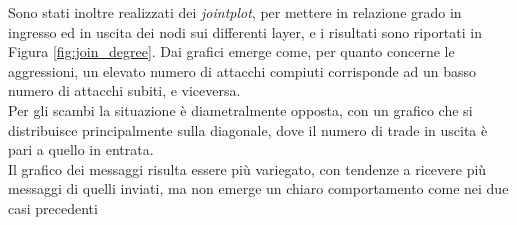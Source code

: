 Sono stati inoltre realizzati dei \textit{jointplot}, per mettere in relazione grado in ingresso ed in uscita dei nodi sui differenti layer, e i risultati sono riportati in Figura \ref{fig:join_degree}. Dai grafici emerge come, per quanto concerne le aggressioni, un elevato numero di attacchi compiuti corrisponde ad un basso numero di attacchi subiti, e viceversa.\\
Per gli scambi la situazione è diametralmente opposta, con un grafico che si distribuisce principalmente sulla diagonale, dove il numero di trade in uscita è pari a quello in entrata.\\
Il grafico dei messaggi risulta essere più variegato, con tendenze a ricevere più messaggi di quelli inviati, ma non emerge un chiaro comportamento come nei due casi precedenti
\begin{figure}
	\hfill
	\hfill
\end{figure}
